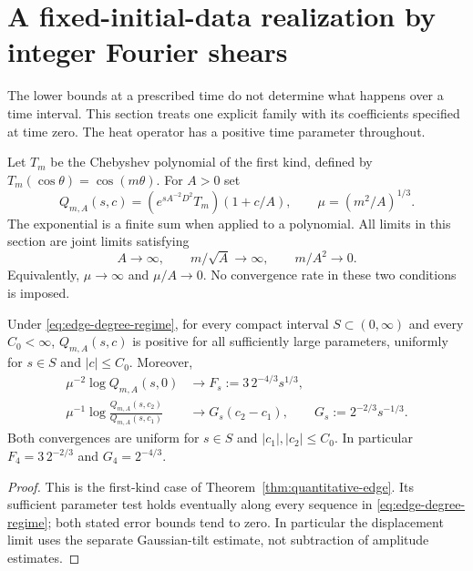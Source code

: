 \section{A fixed-initial-data realization by integer Fourier shears}\label{sec:parabolic}

The lower bounds at a prescribed time do not determine what happens over
a time interval.  This section treats one explicit family with its
coefficients specified at time zero.  The heat operator has a positive
time parameter throughout.

Let $T_m$ be the Chebyshev polynomial of the first kind, defined by
$T_m(\cos\theta)=\cos(m\theta)$.  For $A>0$ set
\begin{equation}\label{eq:heat-edge-definition}
 Q_{m,A}(s,c)=
 \left(e^{sA^{-2}D^2}T_m\right)(1+c/A),
 \qquad \mu=(m^2/A)^{1/3}.
\end{equation}
The exponential is a finite sum when applied to a polynomial.
All limits in this section are joint limits satisfying
\begin{equation}\label{eq:edge-degree-regime}
 A\longrightarrow\infty,\qquad
 m/\sqrt A\longrightarrow\infty,\qquad m/A^2\longrightarrow0.
\end{equation}
Equivalently, $\mu\to\infty$ and $\mu/A\to0$.
No convergence rate in these two conditions is imposed.

\begin{theorem}\label{thm:heat-edge}
Under \eqref{eq:edge-degree-regime}, for every compact interval
$S\subset(0,\infty)$ and every $C_0<\infty$, $Q_{m,A}(s,c)$ is positive
for all sufficiently large parameters, uniformly for $s\in S$ and
$|c|\le C_0$.  Moreover,
\begin{align}
 \mu^{-2}\log Q_{m,A}(s,0)&\longrightarrow
 F_s:=3\,2^{-4/3}s^{1/3},\label{eq:heat-leading-limit}\\
 \mu^{-1}\log\frac{Q_{m,A}(s,c_2)}{Q_{m,A}(s,c_1)}
 &\longrightarrow G_s(c_2-c_1),
 \qquad G_s:=2^{-2/3}s^{-1/3}.
 \label{eq:heat-tilt-limit}
\end{align}
Both convergences are uniform for $s\in S$ and $|c_1|,|c_2|\le C_0$.
In particular $F_4=3\,2^{-2/3}$ and $G_4=2^{-4/3}$.
\end{theorem}

\begin{proof}
This is the first-kind case of Theorem~\ref{thm:quantitative-edge}.
Its sufficient parameter test holds eventually along every sequence
in \eqref{eq:edge-degree-regime}; both stated error bounds tend to zero.
In particular the displacement limit uses the separate Gaussian-tilt
estimate, not subtraction of amplitude estimates.
\end{proof}

